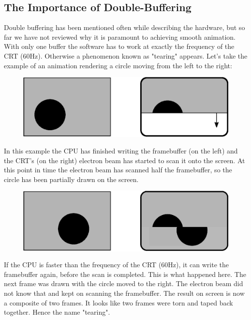 \documentclass[book.tex]{subfiles}
\begin{document}
 

  



\subsection{The Importance of Double-Buffering}
Double buffering has been mentioned often while describing the hardware, but so far we have not reviewed why it is paramount to achieving smooth animation. With only one buffer the software has to work at exactly the frequency of the CRT (60Hz). Otherwise a phenomenon known as "tearing" appears. Let's take the example of an animation rendering a circle moving from the left to the right:
\par
\begin{figure}[H]
\centering
\includegraphics[width=\textwidth]{imgs/drawings/doublebuffer_before.eps}
\end{figure}
\par
In this example the CPU has finished writing the framebuffer (on the left) and the CRT's (on the right) electron beam has started to scan it onto the screen. At this point in time the electron beam has scanned half the framebuffer, so the circle has been partially drawn on the screen.
\par
\begin{figure}[H]
\centering
\includegraphics[width=\textwidth]{imgs/drawings/doublebuffer_after.eps}
\end{figure}
\par
If the CPU is faster than the frequency of the CRT (60Hz), it can write the framebuffer again, before the scan is completed. This is what happened here. The next frame was drawn with the circle moved to the right. The electron beam did not know that and kept on scanning the framebuffer. The result on screen is now a composite of two frames. It looks like two frames were torn and taped back together. Hence the name "tearing".\\
\end{document}
